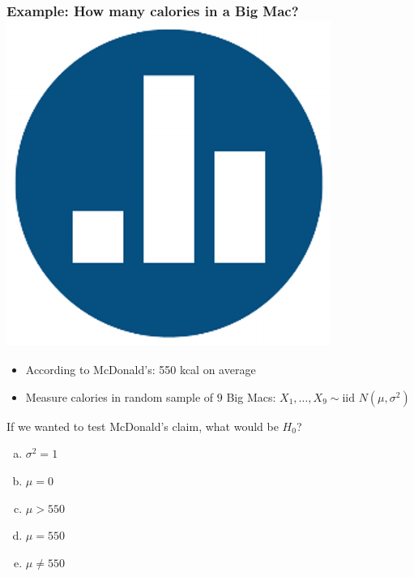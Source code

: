 \begin{frame}[t]
	\frametitle{Example: How many calories in a Big Mac? \hfill \includegraphics[scale = 0.05]{./images/clicker}}
\begin{itemize}
	\item According to McDonald's: 550 kcal on average
	\item Measure calories in random sample of $9$ Big Macs: $X_1, \hdots, X_{9} \sim \mbox{iid } N(\mu, \sigma^2)$
\end{itemize}

\vspace{1em}

\alert{If we wanted to test McDonald's claim, what would be $H_0$?}
\begin{enumerate}[(a)]
	\item $\sigma^2 = 1$
	\item $\mu = 0$
	\item $\mu > 550$ 
	\item $\mu = 550$
	\item $\mu \neq 550$
\end{enumerate}
\end{frame}
